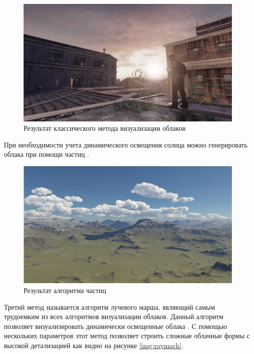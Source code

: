 \begin{figure}[H]
    \centering
    \includegraphics[scale=0.4]{img/result_cloud_sphere.png}
    \caption{Результат классического метода визуализации облаков}
    \label{img:result_sphere}
\end{figure}

При необходимости учета динамического освещения солнца можно генерировать облака при помощи частиц \cite{hpg.20141101}.

\begin{figure}[H]
    \centering
    \includegraphics[scale=0.4]{img/ysov.png}
    \caption{Результат алгоритма частиц}
    \label{img:ysov}
\end{figure}

Третий метод называется алгоритм лучевого марша, являющий самым трудоемким из всех алгоритмов
визуализации облаков. Данный алгоритм позволяет визуализировать динамически освещенные
облака \cite{Sch16}. С помощью нескольких параметров этот метод позволяет строить сложные облачные
формы с высокой детализацией как видно на рисунке \ref{img:raymach}.

